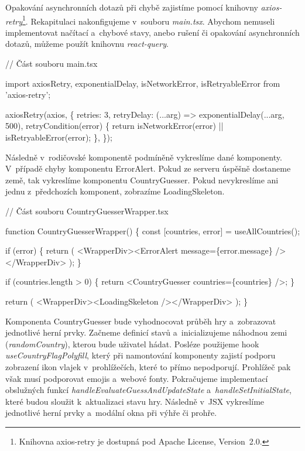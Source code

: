 Opakování asynchronních dotazů při chybě zajistíme pomocí knihovny \emph{axios-retry}\footnote{Knihovna axios-retry je dostupná pod Apache License, Version~2.0.\cite{axiosretrylib}}. 
Rekapitulaci nakonfigujeme v~souboru \emph{main.tsx}. 
Abychom nemuseli implementovat načítací a~chybové stavy, anebo rušení či opakování asynchronních dotazů, můžeme použít knihovnu \emph{react-query}.

\begin{prog}
// Část souboru main.tsx

import axiosRetry, {exponentialDelay, isNetworkError, isRetryableError}
from 'axios-retry';

axiosRetry(axios, \{
  retries: 3,
  retryDelay: (...arg) => exponentialDelay(...arg, 500),
  retryCondition(error) \{
    return isNetworkError(error) || isRetryableError(error);
  \},
\});
\end{prog}

Následně v~rodičovské komponentě podmíněně vykreslíme dané komponenty. V~případě chyby komponentu ErrorAlert. Pokud ze serveru úspěšně dostaneme země, tak vykreslíme komponentu CountryGuesser. 
Pokud nevykreslíme ani jednu z~předchozích komponent, zobrazíme LoadingSkeleton.

\begin{prog}
// Část souboru CountryGuesserWrapper.tsx

function CountryGuesserWrapper() \{
  const [countries, error] = useAllCountries();

  if (error) \{
    return (
      <WrapperDiv><ErrorAlert message=\{error.message\} /></WrapperDiv>
    );
  \}

  if (countries.length > 0) \{
    return <CountryGuesser countries=\{countries\} />;
  \}

  return (
    <WrapperDiv><LoadingSkeleton /></WrapperDiv>
  );
\}
\end{prog}

Komponenta CountryGuesser bude vyhodnocovat průběh hry a~zobrazovat jednotlivé herní prvky. Začneme definicí stavů a~inicializujeme náhodnou zemi (\emph{randomCountry}), kterou bude uživatel hádat. 
Posléze použijeme hook \emph{useCountryFlagPolyfill}, který při namontování komponenty zajistí podporu zobrazení ikon vlajek v~prohlížečích, které to přímo nepodporují. 
Prohlížeč pak však musí podporovat emojis a~webové fonty. Pokračujeme implementací obslužných funkcí \emph{handleEvaluateGuessAndUpdateState} a~\emph{handleSetInitialState}, které budou sloužit k~aktualizaci stavu hry. 
Následně v~JSX vykreslíme jednotlivé herní prvky a~modální okna při výhře či prohře.

